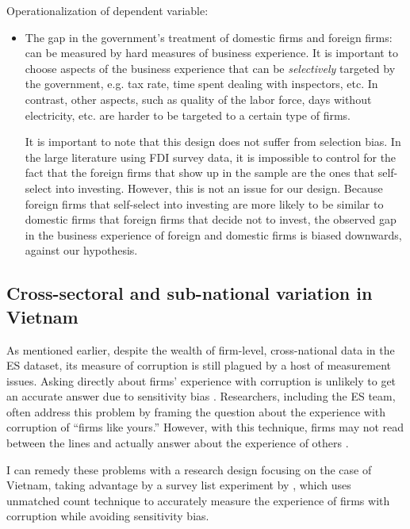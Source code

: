 Operationalization of dependent variable:
\begin{itemize}
\item The gap in the government's treatment of domestic firms and foreign firms: can be measured by hard measures of business experience. It is important to choose aspects of the business experience that can be \textit{selectively} targeted by the government, e.g. tax rate, time spent dealing with inspectors, etc. In contrast, other aspects, such as quality of the labor force, days without electricity, etc. are harder to be targeted to a certain type of firms. 

It is important to note that this design does not suffer from selection bias. In the large literature using FDI survey data, it is impossible to control for the fact that the foreign firms that show up in the sample are the ones that self-select into investing. However, this is not an issue for our design. Because foreign firms that self-select into investing are more likely to be similar to domestic firms that foreign firms that decide not to invest, the observed gap in the business experience of foreign and domestic firms is biased downwards, against our hypothesis.
\end{itemize}

\subsection{Cross-sectoral and sub-national variation in Vietnam}

As mentioned earlier, despite the wealth of firm-level, cross-national data in the ES dataset, its measure of corruption is still plagued by a host of measurement issues. Asking directly about firms' experience with corruption is unlikely to get an accurate answer due to sensitivity bias \citep{Coutts2011}. Researchers, including the ES team, often address this problem by framing the question about the experience with corruption of ``firms like yours.'' However, with this technique, firms may not read between the lines and actually answer about the experience of others \citep{Ahart2004}.

I can remedy these problems with a research design focusing on the case of Vietnam, taking advantage by a survey list experiment by \citet{Malesky2015}, which uses unmatched count technique to accurately measure the experience of firms with corruption while avoiding sensitivity bias.

